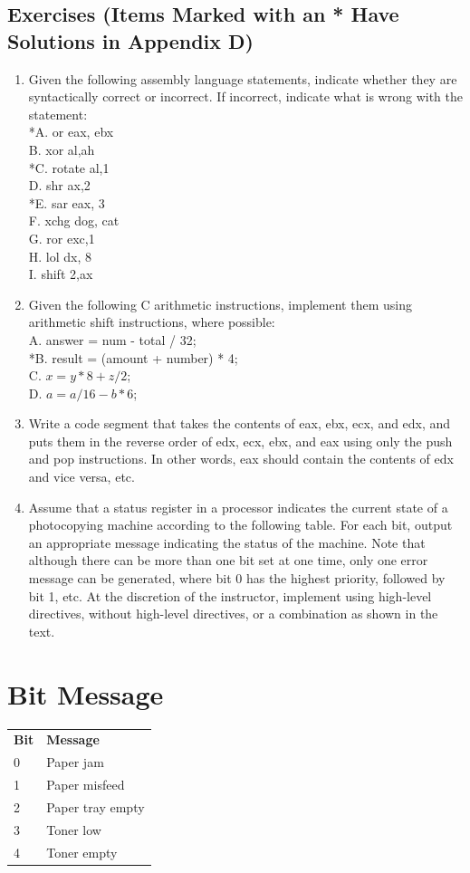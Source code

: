 \documentclass[10pt]{book}
\begin{document}
\subsection{Exercises (Items Marked with an * Have Solutions in Appendix D)}
\begin{enumerate}
  \item Given the following assembly language statements, indicate whether they are syntactically correct or incorrect. If incorrect, indicate what is wrong with the statement:\\
*A. or eax, ebx\\
B. xor al,ah\\
*C. rotate al,1\\
D. shr ax,2\\
*E. sar eax, 3\\
F. xchg dog, cat\\
G. ror exc,1\\
H. lol dx, 8\\
I. shift 2,ax
  \item Given the following C arithmetic instructions, implement them using arithmetic shift instructions, where possible:\\
A. answer = num - total / 32;\\
*B. result = (amount + number) * 4;\\
C. $x = y * 8 + z / 2$;\\
D. $a = a / 16 - b * 6$;
  \item Write a code segment that takes the contents of eax, ebx, ecx, and edx, and puts them in the reverse order of edx, ecx, ebx, and eax using only the push and pop instructions. In other words, eax should contain the contents of edx and vice versa, etc.
  \item Assume that a status register in a processor indicates the current state of a photocopying machine according to the following table. For each bit, output an appropriate message indicating the status of the machine. Note that although there can be more than one bit set at one time, only one error message can be generated, where bit 0 has the highest priority, followed by bit 1, etc. At the discretion of the instructor, implement using high-level directives, without high-level directives, or a combination as shown in the text.
\end{enumerate}

\section{Bit Message}
\begin{tabular}{ll}
\textbf{Bit} & \textbf{Message} \\
0 & Paper jam \\
1 & Paper misfeed \\
2 & Paper tray empty \\
3 & Toner low \\
4 & Toner empty \\
\end{tabular}
\end{document}
